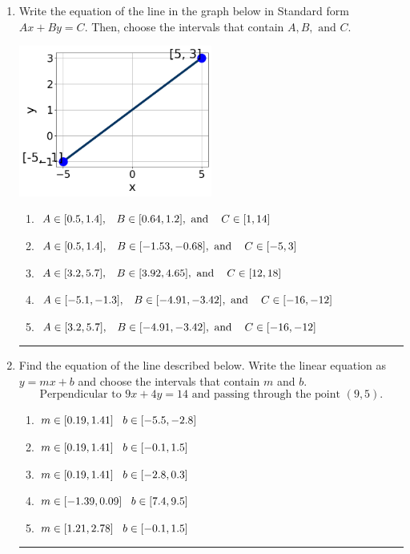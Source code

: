 \documentclass[14pt]{extbook}
\newcommand{\litem}[1]{\item#1\hspace*{-1cm}\rule{\textwidth}{0.4pt}}
\begin{document}
\begin{enumerate}
{\begin{enumerate}[label=\Alph*.]
\end{enumerate} }
\litem{
Write the equation of the line in the graph below in Standard form $Ax+By=C$. Then, choose the intervals that contain $A, B, \text{ and } C$.
\begin{center}
    \includegraphics[width=0.5\textwidth]{../Figures/linearGraphToStandardCopyA.png}
\end{center}
\begin{enumerate}[label=\Alph*.]
\item \( A \in [0.5, 1.4], \hspace{3mm} B \in [0.64, 1.2], \text{ and } \hspace{3mm} C \in [1, 14] \)
\item \( A \in [0.5, 1.4], \hspace{3mm} B \in [-1.53, -0.68], \text{ and } \hspace{3mm} C \in [-5, 3] \)
\item \( A \in [3.2, 5.7], \hspace{3mm} B \in [3.92, 4.65], \text{ and } \hspace{3mm} C \in [12, 18] \)
\item \( A \in [-5.1, -1.3], \hspace{3mm} B \in [-4.91, -3.42], \text{ and } \hspace{3mm} C \in [-16, -12] \)
\item \( A \in [3.2, 5.7], \hspace{3mm} B \in [-4.91, -3.42], \text{ and } \hspace{3mm} C \in [-16, -12] \)

\end{enumerate} }
\litem{
Find the equation of the line described below. Write the linear equation as $ y=mx+b $ and choose the intervals that contain $m$ and $b$.\[ \text{Perpendicular to } 9 x + 4 y = 14 \text{ and passing through the point } (9, 5). \]\begin{enumerate}[label=\Alph*.]
\item \( m \in [0.19, 1.41] \hspace*{3mm} b \in [-5.5, -2.8] \)
\item \( m \in [0.19, 1.41] \hspace*{3mm} b \in [-0.1, 1.5] \)
\item \( m \in [0.19, 1.41] \hspace*{3mm} b \in [-2.8, 0.3] \)
\item \( m \in [-1.39, 0.09] \hspace*{3mm} b \in [7.4, 9.5] \)
\item \( m \in [1.21, 2.78] \hspace*{3mm} b \in [-0.1, 1.5] \)


\end{enumerate}}
\end{enumerate}
\end{document}
